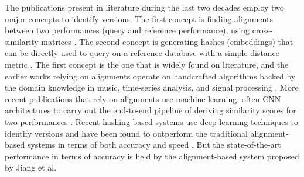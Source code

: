 \documentclass[../main.tex]{subfiles}
\begin{document}
\begin{table}[h]
    \centering
    \caption{Musical changes that can be observed in different version categories}
    \label{tab:musical_changes_cover_songs}
\end{table}

\par
The publications present in literature during the last two decades employ two major concepts to identify versions. The first concept is finding alignments between two performances (query and reference performance), using cross-similarity matrices \cite{gomezSongRemainsSame2006,footeARTHURRetrievingOrchestral2000,serraChromaBinarySimilarity2008,serraCrossRecurrenceQuantification2009,jiang_yang_chen_2020}. The second concept is generating hashes (embeddings) that can be directly used to query on a reference database with a simple distance metric \cite{dorasCoverDetectionUsing2019,yeSupervisedDeepHashing2019b,yuTemporalPyramidPooling2019,yesilerAccurateScalableVersion2020,yesilerLessMoreFaster2020}. The first concept is the one that is widely found on literature, and the earlier works relying on alignments operate on handcrafted algorithms backed by the domain knowledge in music, time-series analysis, and signal processing \cite{gomezSongRemainsSame2006,footeARTHURRetrievingOrchestral2000,serraChromaBinarySimilarity2008,serraCrossRecurrenceQuantification2009}. More recent publications that rely on alignments use machine learning, often \gls{CNN} architectures to carry out the end-to-end pipeline of deriving similarity scores for two performances \cite{jiang_yang_chen_2020}. Recent hashing-based systems use deep learning techniques to identify versions and have been found to outperform the traditional alignment-based systems in terms of both accuracy and speed \cite{dorasCoverDetectionUsing2019,yeSupervisedDeepHashing2019b,yuTemporalPyramidPooling2019,yesilerAccurateScalableVersion2020,yesilerLessMoreFaster2020}. But the state-of-the-art performance in terms of accuracy is held by the alignment-based system proposed by Jiang et al. \cite{jiang_yang_chen_2020}
\end{document}
